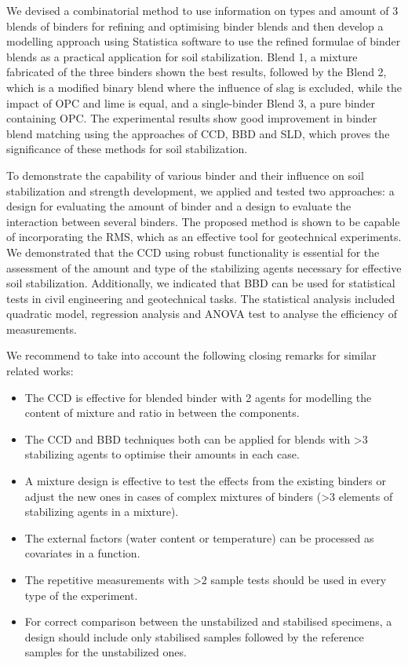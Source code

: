 \documentclass[eprint,
]{actapoly}
\begin{document}
We devised a combinatorial method to use information on types and amount of 3 blends of binders for refining and optimising binder blends and then develop a modelling approach using Statistica software to use the refined formulae of binder blends as a practical application for soil stabilization. Blend 1, a mixture fabricated of the three binders shown the best results, followed by the Blend 2, which is a modified binary blend where the influence of slag is excluded, while the impact of OPC and lime is equal, and a single-binder Blend 3, a pure binder containing OPC. The experimental results show good improvement in binder blend matching using the approaches of CCD, BBD and SLD, which proves the significance of these methods for soil stabilization.

To demonstrate the capability of various binder and their influence on soil stabilization and strength development, we applied and tested two approaches: a design for evaluating the amount of binder and a design to evaluate the interaction between several binders. The proposed method is shown to be capable of incorporating the RMS, which as an effective tool for geotechnical experiments. We demonstrated that the CCD using robust functionality is essential for the assessment of the amount and type of the stabilizing agents necessary for effective soil stabilization. Additionally, we indicated that BBD can be used for statistical tests in civil engineering and geotechnical tasks. The statistical analysis included quadratic model, regression analysis and ANOVA test to analyse the efficiency of measurements.

We recommend to take into account the following closing remarks for similar related works:
\begin{itemize}
	\item The CCD is effective for blended binder with 2 agents for modelling the content of mixture and ratio in between the components.
	\item The CCD and BBD techniques both can be applied for blends with >3 stabilizing agents to optimise their amounts in each case.
	\item A mixture design is effective to test the effects from the existing binders or adjust the new ones in cases of complex mixtures of binders (>3 elements of stabilizing agents in a mixture).
	\item The external factors (water content or temperature) can be processed as covariates in a function.
	\item The repetitive measurements with >2 sample tests should be used in every type of the experiment.
	\item For correct comparison between the unstabilized and stabilised specimens, a design should include only stabilised samples followed by the reference samples for the unstabilized ones.
\end{itemize}
\end{document}
